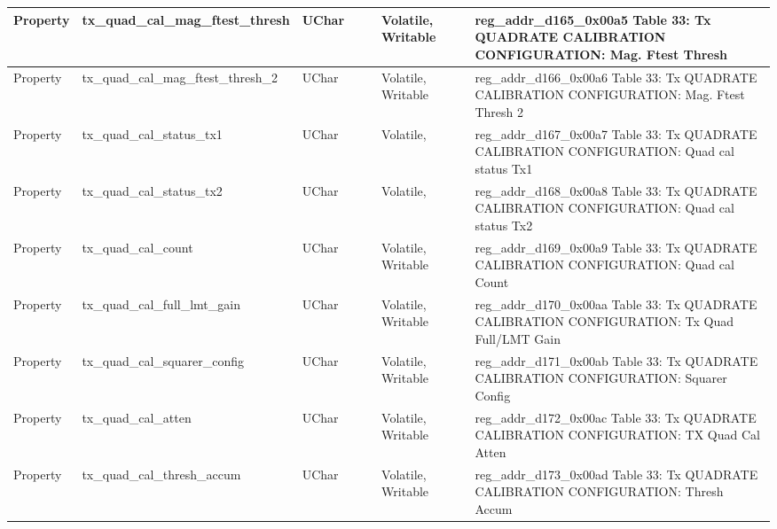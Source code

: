 \documentclass{article}
\begin{document}
\begin{scriptsize}
\begin{longtable}{|p{2cm}|p{5cm}|p{1cm}|p{2cm}|p{2cm}|p{1.75cm}|p{1.5cm}|p{5.1cm}|}
  \hline
  Property & tx\_quad\_cal\_mag\_ftest\_thresh                        & UChar &                  &                  & Volatile,  Writable &         & reg\_addr\_d165\_0x00a5 Table 33: Tx QUADRATE CALIBRATION CONFIGURATION: Mag. Ftest Thresh \\
  \hline
  Property & tx\_quad\_cal\_mag\_ftest\_thresh\_2                     & UChar &                  &                  & Volatile,  Writable &         & reg\_addr\_d166\_0x00a6 Table 33: Tx QUADRATE CALIBRATION CONFIGURATION: Mag. Ftest Thresh 2 \\
  \hline
  Property & tx\_quad\_cal\_status\_tx1                               & UChar &                  &                  & Volatile,           &         & reg\_addr\_d167\_0x00a7 Table 33: Tx QUADRATE CALIBRATION CONFIGURATION: Quad cal status Tx1 \\
  \hline
  Property & tx\_quad\_cal\_status\_tx2                               & UChar &                  &                  & Volatile,           &         & reg\_addr\_d168\_0x00a8 Table 33: Tx QUADRATE CALIBRATION CONFIGURATION: Quad cal status Tx2 \\
  \hline
  Property & tx\_quad\_cal\_count                                     & UChar &                  &                  & Volatile,  Writable &         & reg\_addr\_d169\_0x00a9 Table 33: Tx QUADRATE CALIBRATION CONFIGURATION: Quad cal Count \\
  \hline
  Property & tx\_quad\_cal\_full\_lmt\_gain                           & UChar &                  &                  & Volatile,  Writable &         & reg\_addr\_d170\_0x00aa Table 33: Tx QUADRATE CALIBRATION CONFIGURATION: Tx Quad Full/LMT Gain \\
  \hline
  Property & tx\_quad\_cal\_squarer\_config                           & UChar &                  &                  & Volatile,  Writable &         & reg\_addr\_d171\_0x00ab Table 33: Tx QUADRATE CALIBRATION CONFIGURATION: Squarer Config \\
  \hline
  Property & tx\_quad\_cal\_atten                                     & UChar &                  &                  & Volatile,  Writable &         & reg\_addr\_d172\_0x00ac Table 33: Tx QUADRATE CALIBRATION CONFIGURATION: TX Quad Cal Atten \\
  \hline
  Property & tx\_quad\_cal\_thresh\_accum                             & UChar &                  &                  & Volatile,  Writable &         & reg\_addr\_d173\_0x00ad Table 33: Tx QUADRATE CALIBRATION CONFIGURATION: Thresh Accum \\

\end{longtable}
\end{scriptsize}
\end{document}
